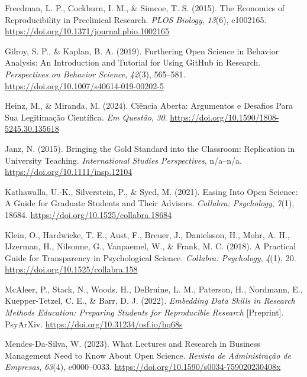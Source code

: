 \documentclass[
  a4paper,
]{book}
\newlength{\cslhangindent}
\newenvironment{CSLReferences}[2] %
 {\begin{list}{}{%
  \setlength{\itemindent}{0pt}
  \setlength{\leftmargin}{0pt}
  \setlength{\parsep}{0pt}
  \ifodd #1
   \setlength{\leftmargin}{\cslhangindent}
   \setlength{\itemindent}{-1\cslhangindent}
  \fi
  \setlength{\itemsep}{#2\baselineskip}}}
 {\end{list}}
\begin{document}
\begin{CSLReferences}{1}{0}
Freedman, L. P., Cockburn, I. M., \& Simcoe, T. S. (2015). The
{Economics} of {Reproducibility} in {Preclinical Research}. \emph{PLOS
Biology}, \emph{13}(6), e1002165.
\url{https://doi.org/10.1371/journal.pbio.1002165}

Gilroy, S. P., \& Kaplan, B. A. (2019). Furthering {Open Science} in
{Behavior Analysis}: {An Introduction} and {Tutorial} for {Using GitHub}
in {Research}. \emph{Perspectives on Behavior Science}, \emph{42}(3),
565--581. \url{https://doi.org/10.1007/s40614-019-00202-5}

Heinz, M., \& Miranda, M. (2024). Ci{ê}ncia {Aberta}: Argumentos e
Desafios Para Sua Legitima{ç}{ã}o Cient{í}fica. \emph{Em Quest{ã}o},
\emph{30}. \url{https://doi.org/10.1590/1808-5245.30.135618}

Janz, N. (2015). Bringing the {Gold Standard} into the {Classroom}:
{Replication} in {University Teaching}. \emph{International Studies
Perspectives}, n/a--n/a. \url{https://doi.org/10.1111/insp.12104}

Kathawalla, U.-K., Silverstein, P., \& Syed, M. (2021). Easing {Into
Open Science}: {A Guide} for {Graduate Students} and {Their Advisors}.
\emph{Collabra: Psychology}, \emph{7}(1), 18684.
\url{https://doi.org/10.1525/collabra.18684}

Klein, O., Hardwicke, T. E., Aust, F., Breuer, J., Danielsson, H., Mohr,
A. H., IJzerman, H., Nilsonne, G., Vanpaemel, W., \& Frank, M. C.
(2018). A {Practical Guide} for {Transparency} in {Psychological
Science}. \emph{Collabra: Psychology}, \emph{4}(1), 20.
\url{https://doi.org/10.1525/collabra.158}

McAleer, P., Stack, N., Woods, H., DeBruine, L. M., Paterson, H.,
Nordmann, E., Kuepper-Tetzel, C. E., \& Barr, D. J. (2022).
\emph{Embedding {Data Skills} in {Research Methods Education}:
{Preparing Students} for {Reproducible Research}} {[}Preprint{]}.
PsyArXiv. \url{https://doi.org/10.31234/osf.io/hq68s}

Mendes-Da-Silva, W. (2023). What {Lectures} and {Research} in {Business
Management Need} to {Know About Open Science}. \emph{Revista de
Administra{ç}{ã}o de Empresas}, \emph{63}(4), e0000--0033.
\url{https://doi.org/10.1590/s0034-759020230408x}


\end{CSLReferences}
\end{document}
